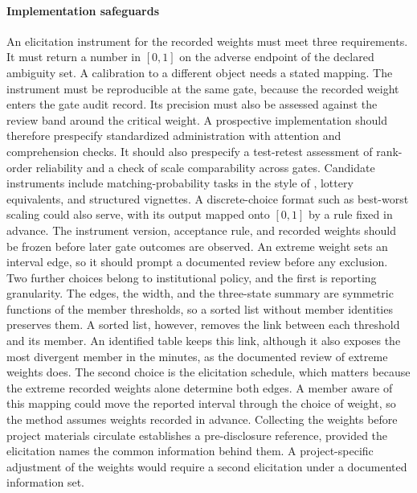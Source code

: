 \documentclass[5p,times,authoryear]{elsarticle}
\theoremstyle{plain}
\begin{document}
\paragraph{Implementation safeguards} An elicitation instrument for the recorded weights must meet three requirements. It must return a number in $[0,1]$ on the adverse endpoint of the declared ambiguity set. A calibration to a different object needs a stated mapping. The instrument must be reproducible at the same gate, because the recorded weight enters the gate audit record. Its precision must also be assessed against the review band around the critical weight. A prospective implementation should therefore prespecify standardized administration with attention and comprehension checks. It should also prespecify a test-retest assessment of rank-order reliability and a check of scale comparability across gates. Candidate instruments include matching-probability tasks in the style of \citet{Dimmock2016}, lottery equivalents, and structured vignettes. A discrete-choice format such as best-worst scaling could also serve, with its output mapped onto $[0,1]$ by a rule fixed in advance. The instrument version, acceptance rule, and recorded weights should be frozen before later gate outcomes are observed. An extreme weight sets an interval edge, so it should prompt a documented review before any exclusion. Two further choices belong to institutional policy, and the first is reporting granularity. The edges, the width, and the three-state summary are symmetric functions of the member thresholds, so a sorted list without member identities preserves them. A sorted list, however, removes the link between each threshold and its member. An identified table keeps this link, although it also exposes the most divergent member in the minutes, as the documented review of extreme weights does. The second choice is the elicitation schedule, which matters because the extreme recorded weights alone determine both edges. A member aware of this mapping could move the reported interval through the choice of weight, so the method assumes weights recorded in advance. Collecting the weights before project materials circulate establishes a pre-disclosure reference, provided the elicitation names the common information behind them. A project-specific adjustment of the weights would require a second elicitation under a documented information set.
\end{document}
